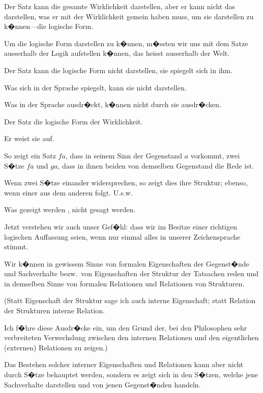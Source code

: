 {Der Satz kann die gesamte Wirklichkeit darstellen,
aber er kann nicht das darstellen, was er
mit der Wirklichkeit gemein haben muss, um sie
darstellen zu k�nnen---die logische Form.

Um die logische Form darstellen zu k�nnen,
m�ssten wir uns mit dem Satze ausserhalb der
Logik aufstellen k�nnen, das heisst ausserhalb der
Welt.}


{Der Satz kann die logische Form nicht darstellen,
sie spiegelt sich in ihm.

Was sich in der Sprache spiegelt, kann sie
nicht darstellen.

Was  in der Sprache ausdr�ckt, k�nnen
 nicht durch sie ausdr�cken.

Der Satz  die logische Form der Wirklichkeit.

Er weist sie auf.}


{So zeigt ein Satz \glqq{}$fa$\grqq{}, dass in seinem Sinn der
Gegenstand $a$ vorkommt, zwei S�tze \glqq{}$fa$\grqq{} und \glqq{}$ga$\grqq{},
dass in ihnen beiden von demselben Gegenstand
die Rede ist.

Wenn zwei S�tze einander widersprechen, so
zeigt dies ihre Struktur; ebenso, wenn einer aus
dem anderen folgt. U.s.w.}


{Was gezeigt werden ,  nicht gesagt
werden.}


{Jetzt verstehen wir auch unser Gef�hl: dass wir
im Besitze einer richtigen logischen Auffassung
seien, wenn nur einmal alles in unserer Zeichensprache
stimmt.}


{{\stretchyspace
Wir k�nnen in gewissem Sinne von formalen
Eigenschaften der Gegenst�nde und Sachverhalte
bezw.\ von Eigenschaften der Struktur der Tatsachen
reden und in demselben Sinne von formalen
Relationen und Relationen von Strukturen.}

(Statt Eigenschaft der Struktur sage ich auch
\glqq{}interne Eigenschaft\grqq{}; statt Relation der Strukturen
\glqq{}interne Relation\grqq{}.

Ich f�hre diese Ausdr�cke ein, um den Grund
der, bei den Philosophen sehr verbreiteten Verwechslung
zwischen den internen Relationen und
den eigentlichen (externen) Relationen zu zeigen.)

Das Bestehen solcher interner Eigenschaften
und Relationen kann aber nicht durch S�tze
behauptet werden, sondern es zeigt sich in den
S�tzen, welche jene Sachverhalte darstellen und
von jenen Gegenst�nden handeln.}


